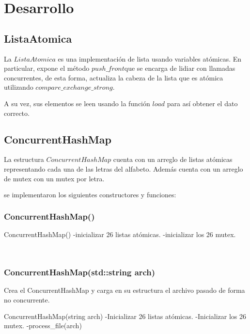 \section{Desarrollo}

\subsection{ListaAtomica}

La $ListaAtomica$ es una implementación de lista usando variables atómicas. En particular, expone el método $push\_front$que se encarga de lidiar con llamadas concurrentes, de esta forma, actualiza la cabeza de la lista que es atómica utilizando $compare\_exchange\_strong$.

A su vez, sus elementos se leen usando la función $load$ para así obtener el dato correcto.

\subsection{ConcurrentHashMap}

La estructura $ConcurrentHashMap$ cuenta con un arreglo de listas atómicas representando cada una de las letras del alfabeto. Además cuenta con un arreglo de mutex con un mutex por letra. 

se implementaron los siguientes constructores y funciones:\\

\subsubsection{ConcurrentHashMap()}
\begin{codesnippet}
ConcurrentHashMap()
 	-inicializar 26 listas atómicas.
 	-inicializar los 26 mutex.
\end{codesnippet}\\

\subsubsection{ConcurrentHashMap(std::string arch)}
Crea el ConcurrentHashMap y carga en su estructura el archivo pasado de forma no concurrente.\\
\begin{codesnippet}
ConcurrentHashMap(string arch)
 	-Inicializar 26 listas atómicas.
 	-Inicializar los 26 mutex.
 	-process_file(arch)
\end{codesnippet}\\

